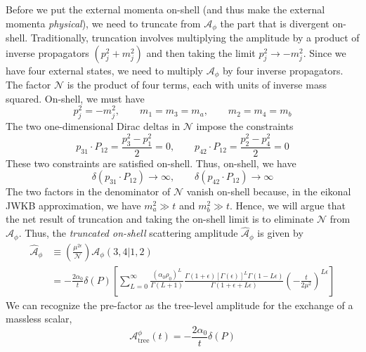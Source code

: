 Before we put the external momenta on-shell (and thus make the external momenta \textit{physical}), we need to truncate from $\mathcal{A}_{\phi}$ the part that is divergent on-shell. Traditionally, truncation involves multiplying the amplitude by a product of inverse propagators $(p_{j}^{2} + m_{j}^{2})$ and then taking the limit $p_{j}^{2} \rightarrow - m_{j}^{2}$. Since we have four external states, we need to multiply $\mathcal{A}_{\phi}$ by four inverse propagators. The factor $\mathcal{N}$ is the product of four terms, each with units of inverse mass squared. On-shell, we must have
\begin{equation}
	p_{j}^{2} = - m_{j}^{2}, \qquad m_{1} = m_{3} = m_{a}, \qquad m_{2} = m_{4} = m_{b}
\end{equation}
The two one-dimensional Dirac deltas in $\mathcal{N}$ impose the constraints
\begin{equation}
	p_{31} \cdot P_{12} = \frac{p_{3}^{2} - p_{1}^{2}}{2} = 0, \qquad p_{42} \cdot P_{12} = \frac{p_{2}^{2} - p_{4}^{2}}{2} = 0
\end{equation}
These two constraints are satisfied on-shell. Thus, on-shell, we have
\begin{equation}
	\delta(p_{31} \cdot P_{12}) \rightarrow \infty, \qquad \delta(p_{42} \cdot P_{12}) \rightarrow \infty
\end{equation}
The two factors in the denominator of $\mathcal{N}$ vanish on-shell because, in the eikonal JWKB approximation, we have $m_{a}^{2} \gg t$ and $m_{b}^{2} \gg t$. Hence, we will argue that the net result of truncation and taking the on-shell limit is to eliminate $\mathcal{N}$ from $\mathcal{A}_{\phi}$. Thus, the \textit{truncated on-shell} scattering amplitude $\widehat{\mathcal{A}}_{\phi}$ is given by
\begin{align}
	\widehat{\mathcal{A}}_{\phi} &\equiv \left( \frac{\mu^{2\epsilon}}{\mathcal{N}} \right) \mathcal{A}_{\phi}(3, 4|1,2) \nonumber \\
	&= -\frac{2\alpha_{0}}{t} \delta(P) \left[ \sum_{L = 0}^{\infty} \frac{\left(\alpha_{0} \rho_{0} \right)^{L}}{\Gamma(L + 1)} \frac{\Gamma(1 + \epsilon) [\Gamma(\epsilon)]^{L} \Gamma(1 - L \epsilon)}{\Gamma(1 + \epsilon + L \epsilon)} \left( -\frac{t}{2 \mu^{2}} \right)^{L \epsilon} \right] \label{AHatPhi}
\end{align}
We can recognize the pre-factor as the tree-level amplitude for the exchange of a massless scalar,
\begin{equation}
	\mathcal{A}_{\text{tree}}^{\phi}(t) = -\frac{2\alpha_{0}}{t} \delta(P)
\end{equation}


